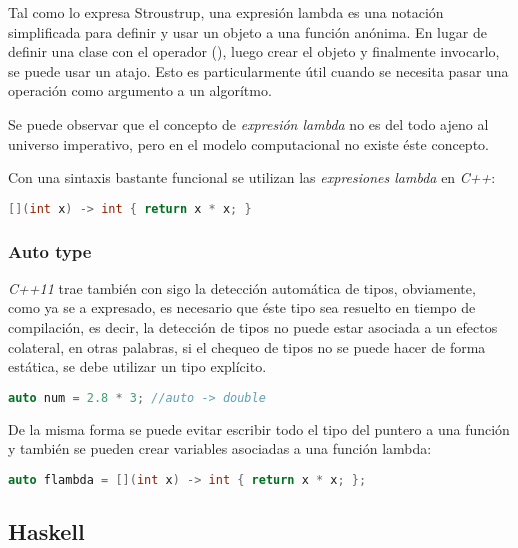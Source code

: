		Tal como lo expresa Stroustrup, una expresión lambda es una notación simplificada para definir y usar un objeto a una función anónima. En lugar de definir una clase con el operador (), luego crear el objeto y finalmente invocarlo, se puede usar un atajo. Esto es particularmente útil cuando se necesita pasar una operación como argumento a un algorítmo.\cite{Bjarne}
		
		Se puede observar que el concepto de \emph{expresión lambda} no es del todo ajeno al universo imperativo, pero en el modelo computacional no existe éste concepto.
		
		Con una sintaxis bastante funcional se utilizan las \emph{expresiones lambda} en \emph{C++}:
		
		\begin{lstlisting}[language=C++, caption="Lambda para elevar al cuadrado un número en C++"]
			[](int x) -> int { return x * x; }
		\end{lstlisting}
	
	\subsubsection{Auto type}
		\emph{C++11} trae también con sigo la detección automática de tipos, obviamente, como ya se a expresado, es necesario que éste tipo sea resuelto en tiempo de compilación, es decir, la detección de tipos no puede estar asociada a un efectos colateral, en otras palabras, si el chequeo de tipos no se puede hacer de forma estática, se debe utilizar un tipo explícito.
	
		\begin{lstlisting}[language=C++, caption="Auto type en C++"]
			auto num = 2.8 * 3; //auto -> double
		\end{lstlisting}
		
		De la misma forma se puede evitar escribir todo el tipo del puntero a una función y también se pueden crear variables asociadas a una función lambda:
		
		\begin{lstlisting}[language=C++, caption="Auto type en C++"]
		auto flambda = [](int x) -> int { return x * x; };
		\end{lstlisting}
				
	\subsection{Haskell}




